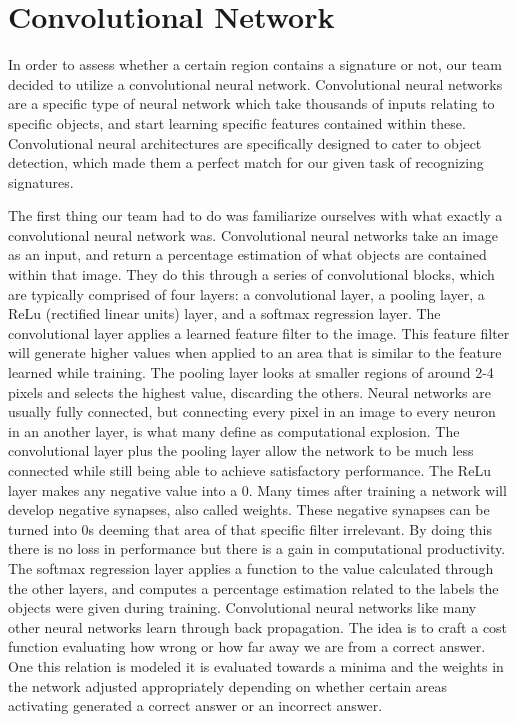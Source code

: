 \documentclass[onecolumn, draftclsnofoot,10pt, compsoc]{IEEEtran}
\begin{document}
\section{Convolutional Network}
In order to assess whether a certain region contains a signature or not, our team decided to 
utilize a convolutional neural network. Convolutional neural networks are a specific type of 
neural network which take thousands of inputs relating to specific objects, and start learning
specific features contained within these. Convolutional neural architectures are specifically
designed to cater to object detection, which made them a perfect match for our given task of
recognizing signatures. 


The first thing our team had to do was familiarize ourselves with what exactly a convolutional neural  network was. Convolutional neural networks take an image as an input, and return a percentage estimation of what objects are contained within that image. They do this through a series of convolutional blocks, which are typically comprised of four layers: a convolutional layer, a pooling layer, a ReLu (rectified linear units) layer, and a softmax regression layer. The convolutional layer applies a learned feature filter to the image. This feature filter will generate higher values when applied to an area that is similar to the feature learned while training. The pooling layer looks at smaller regions of around 2-4 pixels and selects the highest value, discarding the others. Neural networks are usually fully connected, but connecting every pixel in an image to every neuron in an another layer, is what many define as computational explosion. The convolutional layer plus the pooling layer allow the network to be much less connected while still being able to achieve satisfactory performance. The ReLu layer makes any negative value into a 0. Many times after training a network will develop negative synapses, also called weights. These negative synapses can be turned into 0s deeming that area of that specific filter irrelevant. By doing this there is no loss in performance but there is a gain in computational productivity. The softmax regression layer applies a function to the value calculated through the other layers, and computes a percentage estimation related to the labels the objects were given during training. Convolutional neural networks like many other neural networks learn through back propagation. The idea is to craft a cost function evaluating how wrong or how far away we are from a correct answer. One this relation is modeled it is evaluated towards a minima and the weights in the network adjusted appropriately depending on whether certain areas activating generated a correct answer or an incorrect answer. 
\end{document}

